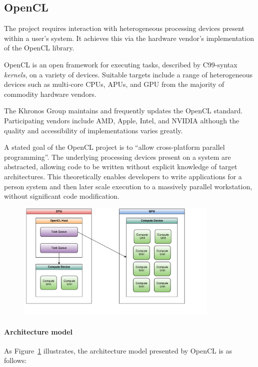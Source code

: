 \subsection{OpenCL}
The project requires interaction with heterogeneous processing devices present within a user's system.
It achieves this via the hardware vendor's implementation of the \ac{OpenCL} library.

\ac{OpenCL} is an open framework for executing tasks, described by C99-syntax \emph{kernels}, on a variety of devices.
Suitable targets include a range of heterogeneous devices such as multi-core \acp{CPU}, \acp{APU}, and \ac{GPU} from the majority of commodity hardware vendors.

The Khronos Group maintains and frequently updates the \ac{OpenCL} standard\cite{khronos}.
Participating vendors include \ac{AMD}, Apple, Intel, and NVIDIA \textemdash{} although the quality and accessibility of implementations varies greatly.

A stated goal of the \ac{OpenCL} project is to ``allow cross-platform parallel programming''.
The underlying processing devices present on a system are abstracted, allowing code to be written without explicit knowledge of target architectures.
This theoretically enables developers to write applications for a person system and then later scale execution to a massively parallel workstation, without significant code modification.

\begin{figure}[h]
	\includegraphics[width=3.8in]{./figures/OpenCLModel}
	\label{fig:ocl_model}
\end{figure}

\paragraph{Architecture model}
As Figure~\ref{fig:ocl_model} illustrates, the architecture model presented by \ac{OpenCL} is as follows:

